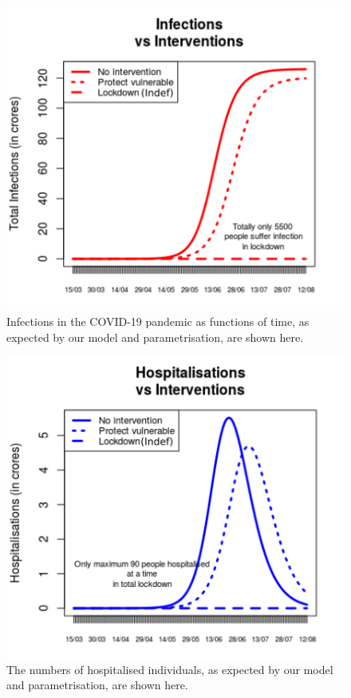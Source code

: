 \documentclass{article}
\begin{document}
\begin{figure}[htp]
\centering
\includegraphics[width=.8\linewidth]{infsvsint.png}
\caption{Infections in the COVID-19 pandemic as functions of time, as expected by our model and parametrisation, are shown here.}
\label{fig:infs}
\end{figure}
\begin{figure}[htp]
\centering
\includegraphics[width=.8\linewidth]{hospvsint.png}
\caption{The numbers of hospitalised individuals, as expected by our model and parametrisation, are shown here.}
\label{fig:hosps}
\end{figure}
\end{document}
